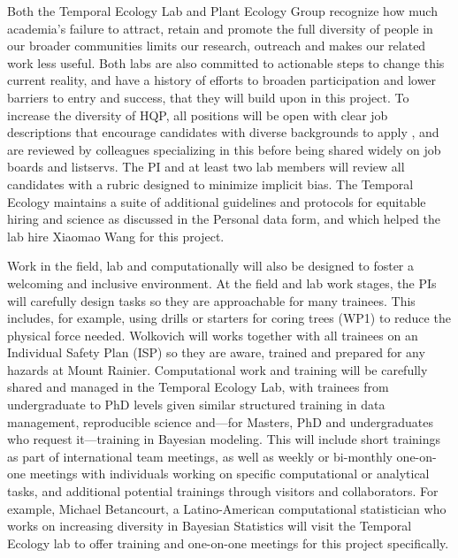 \documentclass[11pt]{article}
\begin{document}
Both the Temporal Ecology Lab and Plant Ecology Group recognize how much academia's failure to attract, retain and promote the full diversity of people in our broader communities limits our research, outreach and makes our related work less useful. Both labs are also committed to actionable steps to change this current reality, and have a history of efforts to broaden participation and lower barriers to entry and success, that they will build upon in this project. To increase the diversity of HQP, all positions will be open with clear job descriptions that encourage candidates with diverse backgrounds to apply \cite{willis2020,bhalla2019}, and are reviewed by colleagues specializing in this before being shared widely on job boards and listservs.  The PI and at least two lab members will review all candidates with a rubric designed to minimize implicit bias. The Temporal Ecology maintains a suite of additional guidelines and protocols for equitable hiring and science as discussed in the Personal data form, and which helped the lab hire Xiaomao Wang for this project. %

Work in the field, lab and computationally will also be designed to foster a welcoming and inclusive environment. At the field and lab work stages, the PIs will carefully design tasks so they are approachable for many trainees. This includes, for example, using drills or starters for coring trees (WP1) to reduce the physical force needed.  Wolkovich will works together with all trainees on an Individual Safety Plan (ISP) so they are aware, trained and prepared for any hazards at Mount Rainier.  Computational work and training will be carefully shared and managed in the Temporal Ecology Lab, with trainees from undergraduate to PhD levels given similar structured training in data management, reproducible science and---for Masters, PhD and undergraduates who request it---training in Bayesian modeling. This will include short trainings as part of international team meetings, as well as weekly or bi-monthly one-on-one meetings with individuals working on specific computational or analytical tasks, and additional potential trainings through visitors and collaborators. For example, Michael Betancourt, a Latino-American computational statistician who works on increasing diversity in Bayesian Statistics will visit the Temporal Ecology lab to offer training and one-on-one meetings for this project specifically. 
\end{document}
